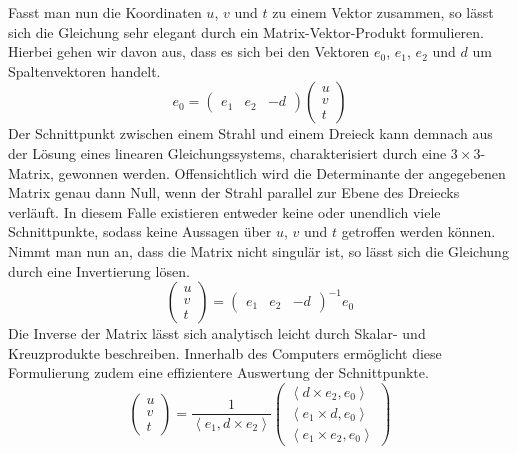 \documentclass[crop=false]{standalone}
\begin{document}
      Fasst man nun die Koordinaten $u$, $v$ und $t$ zu einem Vektor zusammen, so lässt sich die Gleichung sehr elegant durch ein Matrix-Vektor-Produkt formulieren.
      Hierbei gehen wir davon aus, dass es sich bei den Vektoren $e_0$, $e_1$, $e_2$ und $d$ um Spaltenvektoren handelt.
      \[
        e_0 =
        \begin{pmatrix}
          e_1 &
          e_2 &
          -d
        \end{pmatrix}
        \begin{pmatrix}
          u \\
          v \\
          t
        \end{pmatrix}
      \]
      Der Schnittpunkt zwischen einem Strahl und einem Dreieck kann demnach aus der Lösung eines linearen Gleichungssystems, charakterisiert durch eine $3\times 3$-Matrix, gewonnen werden.
      Offensichtlich wird die Determinante der angegebenen Matrix genau dann Null, wenn der Strahl parallel zur Ebene des Dreiecks verläuft.
      In diesem Falle existieren entweder keine oder unendlich viele Schnittpunkte, sodass keine Aussagen über $u$, $v$ und $t$ getroffen werden können.
      Nimmt man nun an, dass die Matrix nicht singulär ist, so lässt sich die Gleichung durch eine Invertierung lösen.
      \[
        \begin{pmatrix}
          u \\
          v \\
          t
        \end{pmatrix}
        =
        \begin{pmatrix}
          e_1 &
          e_2 &
          -d
        \end{pmatrix}^{-1}
        e_0
      \]
      Die Inverse der Matrix lässt sich analytisch leicht durch Skalar- und Kreuzprodukte beschreiben.
      Innerhalb des Computers ermöglicht diese Formulierung zudem eine effizientere Auswertung der Schnittpunkte.
      \[
        \begin{pmatrix}
          u \\
          v \\
          t
        \end{pmatrix}
        =
        \frac{1}{\left\langle e_1, d\times e_2  \right\rangle}
        \begin{pmatrix}
          \left\langle d\times e_2 , e_0 \right\rangle \\
          \left\langle e_1\times d , e_0 \right\rangle \\
          \left\langle e_1\times e_2, e_0 \right\rangle
        \end{pmatrix}
      \]
\end{document}
